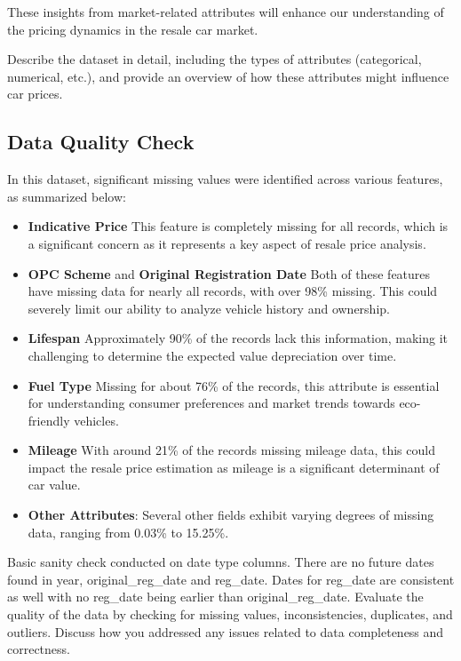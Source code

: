 \documentclass[conference]{IEEEtran}
\begin{document}
These insights from market-related attributes will enhance our understanding of the pricing dynamics in the resale car market.

{\small Describe the dataset in detail, including the types of attributes (categorical, numerical, etc.), and provide an overview of how these attributes might influence car prices.}

\subsection{Data Quality Check}
\label{subsec:data_quality}
In this dataset, significant missing values were identified across various features, as summarized below:

\begin{itemize}
    \item \textbf{Indicative Price} This feature is completely missing for all records, which is a significant concern as it represents a key aspect of resale price analysis.
    
    \item \textbf{OPC Scheme} and \textbf{Original Registration Date} Both of these features have missing data for nearly all records, with over 98\% missing. This could severely limit our ability to analyze vehicle history and ownership.
    
    \item \textbf{Lifespan} Approximately 90\% of the records lack this information, making it challenging to determine the expected value depreciation over time.
    
    \item \textbf{Fuel Type} Missing for about 76\% of the records, this attribute is essential for understanding consumer preferences and market trends towards eco-friendly vehicles.
    
    \item \textbf{Mileage} With around 21\% of the records missing mileage data, this could impact the resale price estimation as mileage is a significant determinant of car value.
    
    \item \textbf{Other Attributes}: Several other fields exhibit varying degrees of missing data, ranging from 0.03\% to 15.25\%. 
\end{itemize}

Basic sanity check conducted on date type columns. There are no future dates found in year, original\_reg\_date and reg\_date. Dates for reg\_date are consistent as well with no reg\_date being earlier than original\_reg\_date.
{\small Evaluate the quality of the data by checking for missing values, inconsistencies, duplicates, and outliers. Discuss how you addressed any issues related to data completeness and correctness.}
\end{document}
